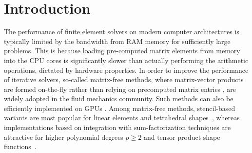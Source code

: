 \documentclass[AMA,STIX1COL]{WileyNJD-v2}
\begin{document}
\section{Introduction}

The performance of finite element solvers on modern computer architectures is typically {\color{red} limited by the bandwidth from RAM memory} for sufficiently large problems.
{\color{red}This is because} loading pre-computed matrix elements from memory into the CPU cores is significantly slower than actually performing the arithmetic operations{\color{red}, dictated by hardware properties}.
In order to improve the performance of iterative solvers, so-called matrix-free methods,
where matrix-vector products are formed on-the-fly rather than relying on precomputed matrix entries \cite{Brown2010,kronbichler12,May2015, Krank2017,  Gmeiner2016},
are widely adopted in the fluid mechanics community.
Such methods can also be efficiently implemented on GPUs \cite{Abdelfattah2016, ljungkvist2017multigrid}.
{\color{red}
Among matrix-free methods, stencil-based variants are most popular for linear elements and tetrahedral shapes~\cite{Gmeiner2016,Bauer2018}, whereas implementations based on integration with sum-factorization techniques are attractive for higher polynomial degrees $p\geq 2$ and tensor product shape functions~\cite{Brown2010,kronbichler12,May2015,Cantwell2011}.
}
\end{document}

